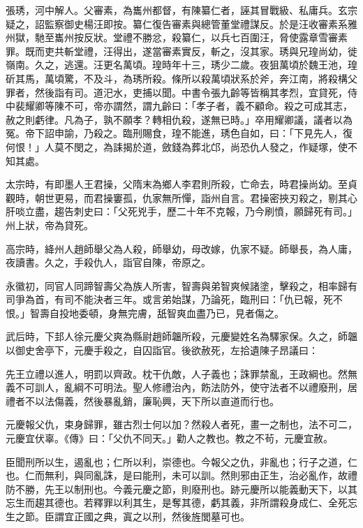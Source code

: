 \begin{pinyinscope}
 張琇，河中解人。父審素，為巂州都督，有陳纂仁者，誣其冒戰級、私庸兵。玄宗疑之，詔監察御史楊汪即按。纂仁復告審素與總管董堂禮謀反。於是汪收審素系雅州獄，馳至巂州按反狀。堂禮不勝忿，殺纂仁，以兵七百圍汪，脅使露章雪審素罪。既而吏共斬堂禮，汪得出，遂當審素實反，斬之，沒其家。琇與兄瑝尚幼，徙嶺南。久之，逃還。汪更名萬頃。瑝時年十三，琇少二歲。夜狙萬頃於魏王池，瑝斫其馬，萬頃驚，不及斗，為琇所殺。條所以殺萬頃狀系於斧，奔江南，將殺構父罪者，然後詣有司。道汜水，吏捕以聞。中書令張九齡等皆稱其孝烈，宜貸死，侍中裴耀卿等陳不可，帝亦謂然，謂九齡曰：「孝子者，義不顧命。殺之可成其志，赦之則虧律。凡為子，孰不願孝？轉相仇殺，遂無已時。」卒用耀卿議，議者以為冤。帝下詔申諭，乃殺之。臨刑賜食，瑝不能進，琇色自如，曰：「下見先人，復何恨！」人莫不閔之，為誄揭於道，斂錢為葬北邙，尚恐仇人發之，作疑塚，使不知其處。



 太宗時，有即墨人王君操，父隋末為鄉人李君則所殺，亡命去，時君操尚幼。至貞觀時，朝世更易，而君操窶孤，仇家無所憚，詣州自言。君操密挾刃殺之，剔其心肝啖立盡，趨告刺史曰：「父死兇手，歷二十年不克報，乃今刷憤，願歸死有司。」州上狀，帝為貸死。



 高宗時，絳州人趙師舉父為人殺，師舉幼，母改嫁，仇家不疑。師舉長，為人庸，夜讀書。久之，手殺仇人，詣官自陳，帝原之。



 永徽初，同官人同蹄智壽父為族人所害，智壽與弟智爽候諸塗，擊殺之，相率歸有司爭為首，有司不能決者三年。或言弟始謀，乃論死，臨刑曰：「仇已報，死不恨。」智壽自投地委頓，身無完膚，舐智爽血盡乃已，見者傷之。



 武后時，下邽人徐元慶父爽為縣尉趙師韞所殺，元慶變姓名為驛家保。久之，師韞以御史舍亭下，元慶手殺之，自囚詣官。後欲赦死，左拾遺陳子昂議曰：



 先王立禮以進人，明罰以齊政。枕干仇敵，人子義也；誅罪禁亂，王政綱也。然無義不可訓人，亂綱不可明法。聖人修禮治內，飭法防外，使守法者不以禮廢刑，居禮者不以法傷義，然後暴亂銷，廉恥興，天下所以直道而行也。



 元慶報父仇，束身歸罪，雖古烈士何以加？然殺人者死，畫一之制也，法不可二，元慶宜伏辜。《傳》曰：「父仇不同天。」勸人之教也。教之不茍，元慶宜赦。



 臣聞刑所以生，遏亂也；仁所以利，崇德也。今報父之仇，非亂也；行子之道，仁也。仁而無利，與同亂誅，是曰能刑，未可以訓。然則邪由正生，治必亂作，故禮防不勝，先王以制刑也。今義元慶之節，則廢刑也。跡元慶所以能義動天下，以其忘生而趨其德也。若釋罪以利其生，是奪其德，虧其義，非所謂殺身成仁、全死忘生之節。臣謂宜正國之典，寘之以刑，然後旌閭墓可也。




\end{pinyinscope}
